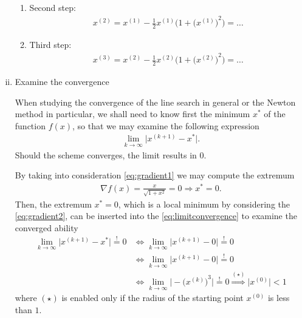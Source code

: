 \documentclass[12pt]{article}
\begin{document}
\begin{enumerate}[(i)]
\begin{enumerate}
		      \item Second step:
		            \begin{align}
			            x^{(2)} 
			            = x^{(1)} - \frac{1}{2} x^{(1)} \Bigg(1 + {\Big(x^{(1)}\Big)}^2 \Bigg)
			            = \dots
		            \end{align}
		            
		      \item Third step:
		            \begin{align}
			            x^{(3)} 
			            = x^{(2)} - \frac{1}{2} x^{(2)} \Bigg(1 + {\Big(x^{(2)}\Big)}^2 \Bigg)
			            = \dots
		            \end{align}
	      \end{enumerate}
	      
	\item Examine the convergence
	      \begin{observationboxed}
		      When studying the convergence of the line search in general or 
		      the Newton method in particular,
		      we shall need to know first the minimum $x^*$ of the function $f(x)$,
		      so that we may examine the following expression
		      \begin{align}
			      \label{eq:limitconvergence}
			      \lim_{k \to \infty} \Big| x^{(k+1)} - x^* \Big|.
		      \end{align}
		      Should the scheme converges, the limit results in $0$.
	      \end{observationboxed}
	      By taking into consideration \eqref{eq:gradient1}
	      we may compute the extremum 
	      \begin{align}
		      \nabla f (x)  
		      = 
		      \frac{x}{\sqrt{1+x^2}}
		      = 0
		      \Rightarrow
		      x^* = 0.
	      \end{align}
	      Then, the extremum $x^* = 0$, which is a local minimum
	      by considering the \eqref{eq:gradient2},
	      can be inserted into the 
	      \eqref{eq:limitconvergence}
	      to examine the converged ability
	      \begin{align}
		      \lim_{k \to \infty} \Big| x^{(k+1)} - x^* \Big| \stackrel{!}{=} 0
		       & \Leftrightarrow
		      \lim_{k \to \infty} \Big| x^{(k+1)} - 0 \Big| \stackrel{!}{=} 0                                 \\
		       & \Leftrightarrow
		      \lim_{k \to \infty} \Big| x^{(k+1)} - 0 \Big| \stackrel{!}{=} 0                                 \\
		       & \Leftrightarrow \lim_{k \to \infty} \Big| - { \Big( x^{(k)} \Big)}^3 \Big| \stackrel{!}{=} 0
		      \stackrel{(\star)}{\Rightarrow}
		      \big| x^{(0)} \big|  < 1
	      \end{align}
	      where $(\star)$ is enabled only if the radius of the starting point $x^{(0)}$ is less than $1$.


\end{enumerate}
\end{document}
